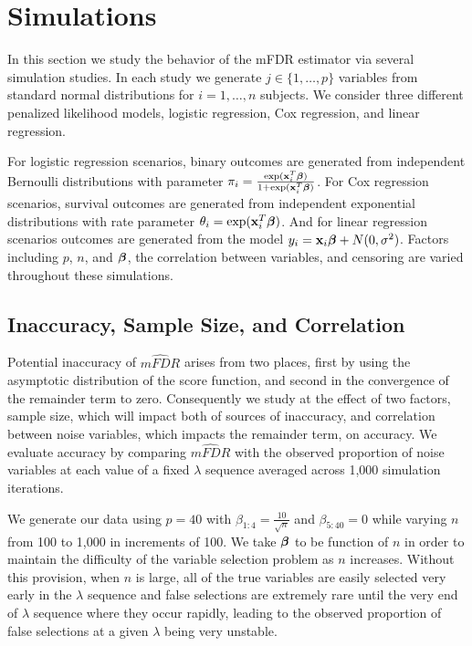 \section{Simulations}

In this section we study the behavior of the mFDR estimator via several simulation studies. In each study we generate $j \in \{1, \ldots, p\}$ variables from standard normal distributions for $i = 1, \ldots, n$ subjects. We consider three different penalized likelihood models, logistic regression, Cox regression, and linear regression.

For logistic regression scenarios, binary outcomes are generated from independent Bernoulli distributions with parameter $\pi_i = \frac{\exp(\mathbf{x}_i^T \boldsymbol{\beta})} {1 + \exp(\mathbf{x}_i^T \boldsymbol{\beta})}$. For Cox regression scenarios, survival outcomes are generated from independent exponential distributions with rate parameter $\theta_i = \exp(\mathbf{x}_i^T \boldsymbol{\beta})$. And for linear regression scenarios outcomes are generated from the model $y_i = \mathbf{x}_i\boldsymbol{\beta} + N(0,\sigma^2)$. Factors including $p$, $n$, and $\boldsymbol{\beta}$, the correlation between variables, and censoring are varied throughout these simulations.

\subsection{Inaccuracy, Sample Size, and Correlation}

Potential inaccuracy of $\widehat{mFDR}$ arises from two places, first by using the asymptotic distribution of the score function, and second in the convergence of the remainder term to zero. Consequently we study at the effect of two factors, sample size, which will impact both of sources of inaccuracy, and correlation between noise variables, which impacts the remainder term, on accuracy. We evaluate accuracy by comparing $\widehat{mFDR}$ with the observed proportion of noise variables at each value of a fixed $\lambda$ sequence averaged across 1,000 simulation iterations.

We generate our data using $p = 40$ with $\beta_{1:4} = \frac{10}{\sqrt{n}}$ and $\beta_{5:40} = 0$ while varying $n$ from 100 to 1,000 in increments of 100. We take $\boldsymbol{\beta}$ to be function of $n$ in order to maintain the difficulty of the variable selection problem as $n$ increases.  Without this provision, when $n$ is large, all of the true variables are easily selected very early in the $\lambda$ sequence and false selections are extremely rare until the very end of $\lambda$ sequence where they occur rapidly, leading to the observed proportion of false selections at a given $\lambda$ being very unstable.

